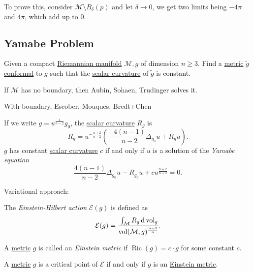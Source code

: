\begin{intuition}
	To prove this, consider \(\mathcal{M} \setminus B_\delta (p)\) and let \(\delta \to 0\), we get two limits being \(-4\pi \) and \(4\pi \), which add up to \(0\).
\end{intuition}


\subsection{Yamabe Problem}
\begin{problem}\label{prb:Yamabe}
Given a compact \hyperref[def:Riemannian-manifold]{Riemannian manifold} \(\mathcal{M} , g\) of dimension \(n \geq 3\). Find a \hyperref[def:Riemannian-metric]{metric} \(\widetilde{g} \) \hyperref[def:conformal]{conformal} to \(g\) such that the \hyperref[def:Ricci-scalar-curvature]{scalar curvature} of \(\widetilde{g} \) is constant.
\end{problem}

If \(\mathcal{M} \) has no boundary, then Aubin, Sohaen, Trudinger solves it.

With boundary, Escober, Mouques, Bredt+Chen

If we write \(g = u^{\frac{4}{n-2}} g_0\), the \hyperref[def:Ricci-scalar-curvature]{scalar curvature} \(R_g\) is
\begin{equation}\label{eq:lec28}
	R_g
	= u^{-\frac{u+2}{n-2}} \left( - \frac{4(n-1)}{n-2} \Delta _{g_0} u + R_g u \right) .
\end{equation}
\(g\) has constant \hyperref[def:Ricci-scalar-curvature]{scalar curvature} \(c\) if and only if \(u\) is a solution of the \emph{Yamabe equation}
\begin{equation}\label{eq:Yamabe}
	\frac{4(n-1)}{n-2} \Delta _{g_0} u - R_{g_0} u + cu^{\frac{n+2}{n-2}} = 0.
\end{equation}


Variational approach:

\begin{definition}\label{def:Einstein-Hilbert-action}
	The \emph{Einstein-Hilbert action} \(\mathcal{E} (g)\) is defined as
	\[
		\mathcal{E} (g) = \cfrac{\int _\mathcal{M} R_g \,\mathrm{d} \mathop{\mathrm{vol}} _g}{\mathop{\mathrm{vol}}(\mathcal{M} , g)^{\frac{n-2}{n}} }.
	\]
\end{definition}
\begin{definition}\label{def:Einstein-metric}
	A \hyperref[def:Riemannian-metric]{metric} \(g\) is called an \emph{Einstein metric} if \(\mathop{\mathrm{Ric}}(g) = c\cdot g \) for some constant \(c\).
\end{definition}
\begin{remark}
	A \hyperref[def:Riemannian-metric]{metric} \(g\) is a critical point of \(\mathcal{E} \) if and only if \(g\) is an \hyperref[def:Einstein-metric]{Einstein metric}.
\end{remark}


